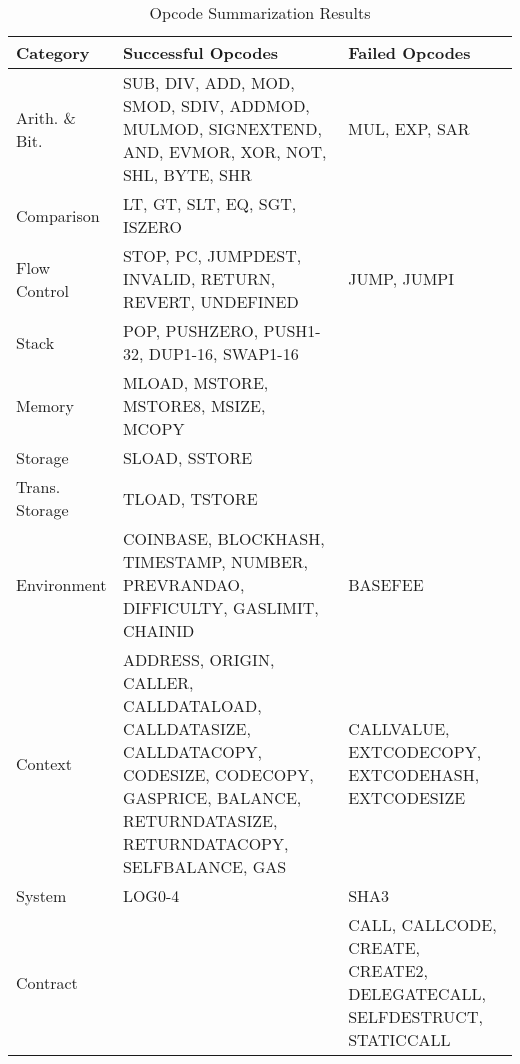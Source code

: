 \begin{table}[htbp]
\centering
\caption{Opcode Summarization Results}
\label{tab:step3_opcode_list}
\begin{tabularx}{\textwidth}{XXX}
\toprule
Category & Successful Opcodes & Failed Opcodes \\
\midrule
Arith. \& Bit. & SUB, DIV, ADD, MOD, SMOD, SDIV, ADDMOD, MULMOD, SIGNEXTEND, AND, EVMOR, XOR, NOT, SHL, BYTE, SHR & MUL, EXP, SAR \\
Comparison & LT, GT, SLT, EQ, SGT, ISZERO &  \\
Flow Control & STOP, PC, JUMPDEST, INVALID, RETURN, REVERT, UNDEFINED & JUMP, JUMPI \\
Stack & POP, PUSHZERO, PUSH1-32, DUP1-16, SWAP1-16 &  \\
Memory & MLOAD, MSTORE, MSTORE8, MSIZE, MCOPY &  \\
Storage & SLOAD, SSTORE &  \\
Trans. Storage & TLOAD, TSTORE &  \\
Environment & COINBASE, BLOCKHASH, TIMESTAMP, NUMBER, PREVRANDAO, DIFFICULTY, GASLIMIT, CHAINID & BASEFEE \\
Context & ADDRESS, ORIGIN, CALLER, CALLDATALOAD, CALLDATASIZE, CALLDATACOPY, CODESIZE, CODECOPY, GASPRICE, BALANCE, RETURNDATASIZE, RETURNDATACOPY, SELFBALANCE, GAS & CALLVALUE, EXTCODECOPY, EXTCODEHASH, EXTCODESIZE \\
System & LOG0-4 & SHA3 \\
Contract &  & CALL, CALLCODE, CREATE, CREATE2, DELEGATECALL, SELFDESTRUCT, STATICCALL \\
\bottomrule
\end{tabularx}
\end{table}
